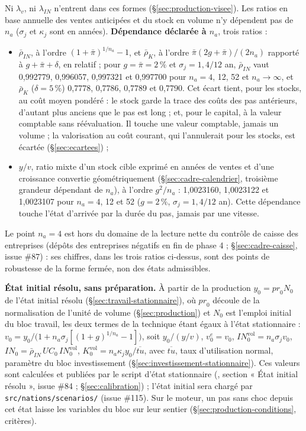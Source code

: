 \documentclass[11pt,a4paper]{article}
\newcommand{\code}[1]{\texttt{\detokenize{#1}}}
\begin{document}
Ni $\lambda_v$, ni $\lambda_{\mathit{IN}}$ n'entrent dans ces formes (\S\ref{sec:production-visee}). Les ratios en base annuelle des ventes anticipées et du stock en volume n'y dépendent pas de $n_a$ ($\sigma_j$ et $\kappa_j$ sont en années). \textbf{Dépendance déclarée à $n_a$}, trois ratios :
\begin{itemize}
\item $\bar\rho_{\mathit{IN}}$, à l'ordre $(1 + \bar\pi)^{1/n_a} - 1$, et $\bar\rho_K$, à l'ordre $\bar\pi(2g + \bar\pi)/(2n_a)$ rapporté à $g + \bar\pi + \delta$, en relatif ; pour $g = \bar\pi = 2\,\%$ et $\sigma_j = 1{,}4/12$ an, $\bar\rho_{\mathit{IN}}$ vaut 0,992779, 0,996057, 0,997321 et 0,997700 pour $n_a = 4$, 12, 52 et $n_a \to \infty$, et $\bar\rho_K$ ($\delta = 5\,\%$) 0,7778, 0,7786, 0,7789 et 0,7790. Cet écart tient, pour les stocks, au coût moyen pondéré : le stock garde la trace des coûts des pas antérieurs, d'autant plus anciens que le pas est long ; et, pour le capital, à la valeur comptable sans réévaluation. Il touche une valeur comptable, jamais un volume ; la valorisation au coût courant, qui l'annulerait pour les stocks, est écartée (\S\ref{sec:ecartees}) ;
\item $y/v$, ratio mixte d'un stock cible exprimé en années de ventes et d'une croissance convertie géométriquement (\S\ref{sec:cadre-calendrier}, troisième grandeur dépendant de $n_a$), à l'ordre $g^2/n_a$ : 1,0023160, 1,0023122 et 1,0023107 pour $n_a = 4$, 12 et 52 ($g = 2\,\%$, $\sigma_j = 1{,}4/12$ an). Cette dépendance touche l'état d'arrivée par la durée du pas, jamais par une vitesse.
\end{itemize}
Le point $n_a = 4$ est hors du domaine de la lecture nette du contrôle de caisse des entreprises (dépôts des entreprises négatifs en fin de phase 4 ; \S\ref{sec:cadre-caisse}, issue \#87) : ses chiffres, dans les trois ratios ci-dessus, sont des points de robustesse de la forme fermée, non des états admissibles.

\textbf{État initial résolu, sans préparation.} À partir de la production $y_0 = \mathit{pr}_0 N_0$ de l'état initial résolu (\S\ref{sec:travail-stationnaire}), où $\mathit{pr}_0$ découle de la normalisation de l'unité de volume (\S\ref{sec:production}) et $N_0$ est l'emploi initial du bloc travail, les deux termes de la technique étant égaux à l'état stationnaire : $v_0 = y_0/\bigl(1 + n_a\sigma_j[(1 + g)^{1/n_a} - 1]\bigr)$, soit $y_0/(y/v)$, $v^e_0 = v_0$, $\mathit{IN}^{\mathrm{vol}}_0 = n_a \sigma_j v_0$, $\mathit{IN}_0 = \bar\rho_{\mathit{IN}}\,\mathit{UC}_0\,\mathit{IN}^{\mathrm{vol}}_0$, $K^{\mathrm{vol}}_0 = n_a \kappa_j y_0/\overline{\mathit{tu}}$, avec $\overline{\mathit{tu}}$, taux d'utilisation normal, paramètre du bloc investissement (\S\ref{sec:investissement-stationnaire}). Ces valeurs sont calculées et publiées par le script d'état stationnaire (\code{outils/etat_stationnaire.py}, section « État initial résolu », issue \#84 ; \S\ref{sec:calibration}) ; l'état initial sera chargé par \nolinkurl{src/nations/scenarios/} (issue \#115). Sur le moteur, un pas sans choc depuis cet état laisse les variables du bloc sur leur sentier (\S\ref{sec:production-conditions}, critères).
\end{document}
